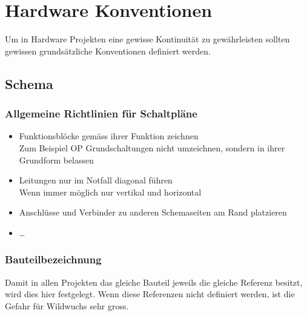 



\section{Hardware Konventionen}
Um in Hardware Projekten eine gewisse Kontinuität zu gewährleisten sollten 
gewissen grundsätzliche Konventionen definiert werden. 

\subsection{Schema}

\subsubsection{Allgemeine Richtlinien für Schaltpläne}
\begin{itemize}
  \item Funktionsblöcke gemäss ihrer Funktion zeichnen\\
        Zum Beispiel OP Grundschaltungen nicht umzeichnen, sondern in ihrer 
        Grundform belassen
  \item Leitungen nur im Notfall diagonal führen\\
        Wenn immer möglich nur vertikal und horizontal
  \item Anschlüsse und Verbinder zu anderen Schemaseiten am Rand platzieren
  \item \dots
\end{itemize}

\subsubsection{Bauteilbezeichnung}
Damit in allen Projekten das gleiche Bauteil jeweils die gleiche Referenz 
besitzt, wird dies hier festgelegt. Wenn diese Referenzen nicht definiert 
werden, ist die Gefahr für Wildwuchs sehr gross. 

